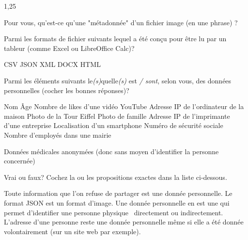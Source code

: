 \documentclass[11pt,a4paper]{exam}
\begin{document}
\begin{spacing}{1,25}
\begin{questions}
             \newpage
            
            \question[1] Pour vous, qu'est-ce qu'une "métadonnée" d'un fichier image (en une phrase) ?
    
            \question[1] Parmi les formats de fichier suivants lequel a été conçu
            pour être lu par un tableur (comme Excel ou LibreOffice Calc)?
            \begin{choices}
                \choice CSV
                \choice JSON
                \choice XML
                \choice DOCX
                \choice HTML
            \end{choices}
            \addpoints
    
            \question[2] Parmi les éléments suivants le\textit{(s)}quelle\textit{(s)}
            est \textit{/ sont}, selon vous, des données personnelles (cocher les bonnes réponses)?
            \addpoints
            \begin{checkboxes}
                \choice Nom
                \choice Âge
                \choice Nombre de likes d'une vidéo YouTube
                \choice Adresse IP de l'ordinateur de la maison
                \choice Photo de la Tour Eiffel
                \choice Photo de famille
                \choice Adresse IP de l'imprimante d'une entreprise
                \choice Localisation d'un smartphone
                \choice Numéro de sécurité sociale
                \choice Nombre d'employés dans une mairie
    
                \choice Données médicales anonymées (donc sans moyen d'identifier la personne concernée)
            \end{checkboxes}
            
            \question[2] Vrai ou faux? Cochez la ou les propositions exactes dans la liste ci-dessous.
        \begin{checkboxes}
            \choice Toute information que l'on refuse de partager est une donnée personnelle.
            \choice Le format JSON est un format d'image.
            \choice Une donnée personnelle en est une qui permet d'identifier une personne
                physique \textemdash\ directement ou indirectement.
            \choice L’adresse d’une personne reste une donnée personnelle même si elle
		a été donnée volontairement (sur un site web par exemple).
            \end{checkboxes}
            
    
        \end{questions}
    \end{spacing}
\end{document}
